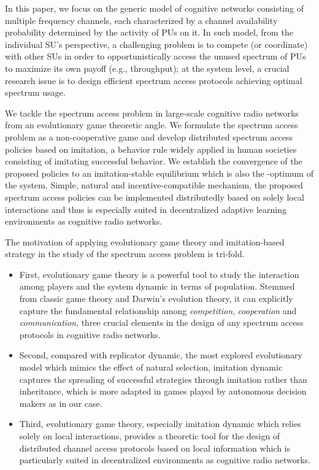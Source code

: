\documentclass[12pt, onecolumn]{IEEEtran}
\theoremstyle{plain}
\theoremstyle{definition}
\begin{document}
In this paper, we focus on the generic model of cognitive networks consisting of multiple frequency channels, each characterized by a channel availability probability determined by the activity of PUs on it. In such model, from the individual SU's perspective, a challenging problem is to compete (or coordinate) with other SUs in order to opportunistically access the unused spectrum of PUs to maximize its own payoff (e.g., throughput); at the system level, a crucial research issue is to design efficient spectrum access protocols achieving optimal spectrum usage.

We tackle the spectrum access problem in large-scale cognitive radio networks from an evolutionary game theoretic angle. We formulate the spectrum access problem as a non-cooperative game and develop distributed spectrum access policies based on imitation, a behavior rule widely applied in human societies consisting of imitating successful behavior. We establish the convergence of the proposed policies to an imitation-stable equilibrium which is also the -optimum of the system. Simple, natural and incentive-compatible mechanism, the proposed spectrum access policies can be implemented distributedly based on solely local interactions and thus is especially suited in decentralized adaptive learning environments as cognitive radio networks.

The motivation of applying evolutionary game theory and imitation-based strategy in the study of the spectrum access problem is tri-fold.
\begin{itemize}
\item First, evolutionary game theory is a powerful tool to study the interaction among players and the system dynamic in terms of population. Stemmed from classic game theory and Darwin's evolution theory, it can explicitly capture the fundamental relationship among \textit{competition}, \textit{cooperation} and \textit{communication}, three crucial elements in the design of any spectrum access protocols in cognitive radio networks.
\item Second, compared with replicator dynamic, the most explored evolutionary model which mimics the effect of natural selection, imitation dynamic captures the spreading of successful strategies through imitation ra\-ther than inheritance, which is more adapted in games played by autonomous decision makers as in our case.
\item Third, evolutionary game theory, especially imitation dynamic which relies solely on local interactions, provides a theoretic tool for the design of distributed channel access protocols based on local information which is particularly suited in decentralized environments as cognitive radio networks.
\end{itemize}
\end{document}
